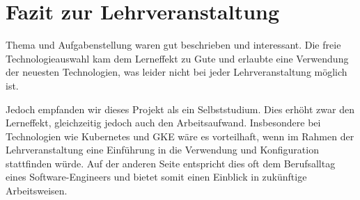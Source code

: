 \section{Fazit zur Lehrveranstaltung}
Thema und Aufgabenstellung waren gut beschrieben und interessant.
Die freie Technologieauswahl kam dem Lerneffekt zu Gute und erlaubte eine Verwendung der neuesten Technologien, was leider nicht bei jeder Lehrveranstaltung möglich ist.

Jedoch empfanden wir dieses Projekt als ein Selbststudium.
Dies erhöht zwar den Lerneffekt, gleichzeitig jedoch auch den Arbeitsaufwand.
Insbesondere bei Technologien wie Kubernetes und GKE wäre es vorteilhaft, wenn im Rahmen der Lehrveranstaltung eine Einführung in die Verwendung und Konfiguration stattfinden würde.
Auf der anderen Seite entspricht dies oft dem Berufsalltag eines Software-Engineers und bietet somit einen Einblick in zukünftige Arbeitsweisen.

